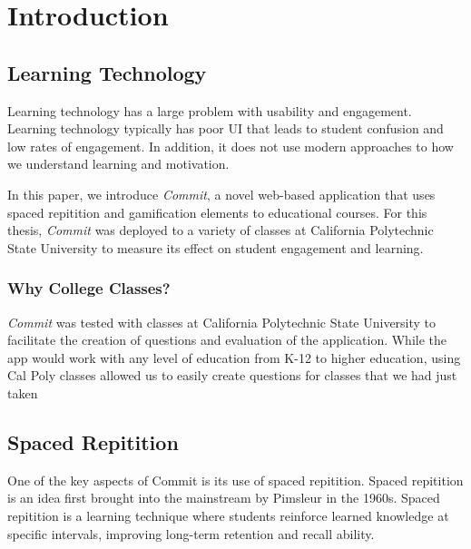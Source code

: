 \chapter{Introduction}

\section{Learning Technology}
\par 


\par Learning technology has a large problem with usability and engagement. Learning technology typically has poor UI that leads to student confusion and low rates of engagement. In addition, it does not use modern approaches to how we understand learning and motivation.

\par In this paper, we introduce \textit{Commit}, a novel web-based application that uses spaced repitition and gamification elements to educational courses. For this thesis, \textit{Commit} was deployed to a variety of classes at California Polytechnic State University to measure its effect on student engagement and learning.

\subsection{Why College Classes?}
\par \textit{Commit} was tested with classes at California Polytechnic State University to facilitate the creation of questions and evaluation of the application. While the app would work with any level of education from K-12 to higher education, using Cal Poly classes allowed us to easily create questions for classes that we had just taken


\section{Spaced Repitition}
\par One of the key aspects of Commit is its use of spaced repitition. Spaced repitition is an idea first brought into the mainstream by Pimsleur in the 1960s. Spaced repitition is a learning technique where students reinforce learned knowledge at specific intervals, improving long-term retention and recall ability.

